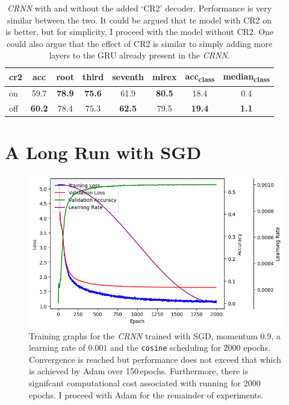\begin{table}[H]
    \centering
    \begin{tabular}{lccccccc}
        \toprule
        cr2 & acc & root & third & seventh & mirex & acc\textsubscript{class} & median\textsubscript{class} \\  
        \midrule
        on & 59.7 & \textbf{78.9} & \textbf{75.6} & 61.9 & \textbf{80.5} & 18.4 & 0.4 \\
        off & \textbf{60.2} & 78.4 & 75.3 & \textbf{62.5} & 79.5 & \textbf{19.4} & \textbf{1.1} \\
        \bottomrule
    \end{tabular}
    \caption{\emph{CRNN} with and without the added `CR2' decoder. Performance is very similar between the two. It could be argued that te model with CR2 on is better, but for simplicity, I proceed with the model without CR2. One could also argue that the effect of CR2 is similar to simply adding more layers to the GRU already present in the \emph{CRNN}.}
\end{table}

\section{A Long Run with SGD}\label{app:long_sgd}
\begin{figure}[H]
    \centering
    \includegraphics[width=1.0\textwidth]{figures/long_sgd_training_plot.png}
    \caption{Training graphs for the \emph{CRNN} trained with SGD, momentum 0.9, a learning rate of $0.001$ and the \texttt{cosine} scheduling for 2000 epochs. Convergence is reached but performance does not exceed that which is achieved by Adam over 150\,epochs. Furthermore, there is signifcant computational cost associated with running for 2000 epochs. I proceed with Adam for the remainder of experiments. }\label{fig:long_sgd}
\end{figure}


